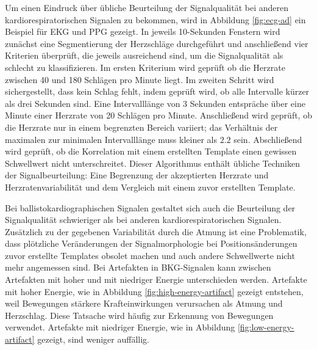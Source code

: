 	Um einen Eindruck über übliche Beurteilung der Signalqualität bei anderen kardiorespiratorischen Signalen zu bekommen, wird in Abbildung \ref{fig:ecg-ad} ein Beispiel für \ac{EKG} und \ac{PPG} gezeigt. In jeweils 10-Sekunden Fenstern wird zunächst eine Segmentierung der Herzschläge durchgeführt und anschließend vier Kriterien überprüft, die jeweils ausreichend sind, um die Signalqualität als schlecht zu klassifizieren. Im ersten Kriterium wird geprüft ob die Herzrate zwischen 40 und 180 Schlägen pro Minute liegt. Im zweiten Schritt wird sichergestellt, dass kein Schlag fehlt, indem geprüft wird, ob alle Intervalle kürzer als drei Sekunden sind. Eine Intervalllänge von 3 Sekunden entspräche über eine Minute einer Herzrate von 20 Schlägen pro Minute. Anschließend wird geprüft, ob die Herzrate nur in einem begrenzten Bereich variiert; das Verhältnis der maximalen zur minimalen Intervalllänge muss kleiner als $2.2$ sein. Abschließend wird geprüft, ob die Korrelation mit einem erstellten Template einen gewissen Schwellwert nicht unterschreitet. Dieser Algorithmus enthält übliche Techniken der Signalbeurteilung: Eine Begrenzung der akzeptierten Herzrate und Herzratenvariabilität und dem Vergleich mit einem zuvor erstellten Template.
	
	Bei ballistokardiographischen Signalen gestaltet sich auch die Beurteilung der Signalqualität schwieriger als bei anderen kardiorespiratorischen Signalen. Zusätzlich zu der gegebenen Variabilität durch die Atmung ist eine Problematik, dass plötzliche Veränderungen der Signalmorphologie bei Positionsänderungen zuvor erstellte Templates obsolet machen und auch andere Schwellwerte nicht mehr angemessen sind. Bei Artefakten in \ac{BKG}-Signalen kann zwischen Artefakten mit hoher und mit niedriger Energie unterschieden werden. Artefakte mit hoher Energie, wie in Abbildung \ref{fig:high-energy-artifact} gezeigt entstehen, weil Bewegungen stärkere Krafteinwirkungen verursachen als Atmung und Herzschlag. Diese Tatsache wird häufig zur Erkennung von Bewegungen verwendet. Artefakte mit niedriger Energie, wie in Abbildung \ref{fig:low-energy-artifact} gezeigt, sind weniger auffällig.
	
